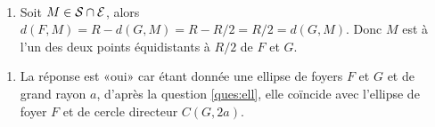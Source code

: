 \documentclass[a4paper,12pt,reqno]{amsart}
\begin{document}
\begin{solution}
  ~
  \vspace{-17mm}

  \begin{enumerate}[resume]
    \item Soit $M \in \mathcal{S} \cap \mathcal{E}$, alors $d(F,M) = R - d(G,M) = R-R/2 = R/2 = d(G,M)$. Donc $M$ est à l'un des deux points équidistants à $R/2$ de $F$ et $G$.
  \end{enumerate}

  \begin{enumerate}[resume]
    \item La réponse est «oui» car étant donnée une ellipse de foyers $F$ et $G$ et de grand rayon $a$, d'après la question \eqref{ques:ell}, elle coïncide avec l'ellipse de foyer $F$ et de cercle directeur $C(G,2a)$.
  \end{enumerate}
\end{solution}
\end{document}
